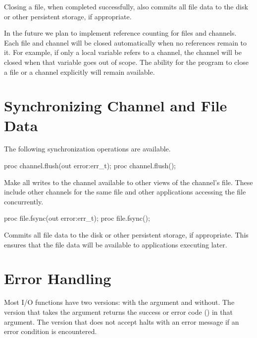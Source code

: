 Closing a file, when completed successfully, also commits
all file data to the disk or other persistent storage,
if appropriate.

\begin{future}
In the future we plan to implement reference counting for files
and channels. Each file and channel will be closed automatically
when no references remain to it. For example, if only a local
variable refers to a channel, the channel will be closed
when that variable goes out of scope.
The ability for the program to close a file or a channel
explicitly will remain available.
\end{future}


\section{Synchronizing Channel and File Data}
\label{IO_synchronization}

The following synchronization operations are available.

\begin{protohead}
proc channel.flush(out error:err_t);
proc channel.flush();
\end{protohead}
\begin{protobody}
Make all writes to the channel available to other views of the
channel's file. These include other channels for the same file and
other applications accessing the file concurrently.
\end{protobody}

\begin{protohead}
proc file.fsync(out error:err_t);
proc file.fsync();
\end{protohead}
\begin{protobody}
Commits all file data to the disk or other persistent storage, if
appropriate. This ensures that the file data will be available to
applications executing later.
\end{protobody}


\section{Error Handling}
\label{IO_error_handling}

Most I/O functions have two versions: with the 
argument and without. The version that takes the  argument
returns the success or error code () in that argument.
The version that does not accept  halts with an error message
if an error condition is encountered.

